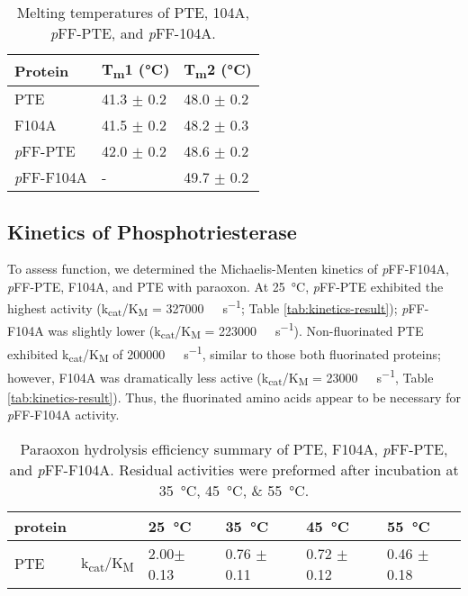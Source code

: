 \begin{refsection}
\begin{table}[htbp]
\centering
\caption[Melting temperatures of PTE, 104A, \emph{p}FF-PTE, and
\emph{p}FF-104A]{Melting temperatures of PTE, 104A, \emph{p}FF-PTE, and
\emph{p}FF-104A.} 
\begin{tabular}{ lll }
  \hline
  Protein & T\textsubscript{m}1 (\si{\celsius}) & T\textsubscript{m}2 (\si{\celsius}) \\
  \hline
  PTE & 41.3 $\pm$ 0.2 & 48.0 $\pm$ 0.2 \\
  F104A & 41.5 $\pm$ 0.2 & 48.2 $\pm$ 0.3 \\
  \emph{p}FF-PTE & 42.0 $\pm$ 0.2 & 48.6 $\pm$ 0.2  \\
  \emph{p}FF-F104A & - & 49.7 $\pm$ 0.2  \\
  \hline
\end{tabular}
    \label{tab:DSC} 
\end{table}

\subsection{Kinetics of Phosphotriesterase}

To assess function, we determined the Michaelis-Menten kinetics of
\emph{p}FF-F104A, \emph{p}FF-PTE, F104A, and PTE with paraoxon. At
\SI{25}{\celsius}, \emph{p}FF-PTE exhibited the highest activity
(k\textsubscript{cat}/K\textsubscript{M} = \SI{327000}{\per\Molar\per\second};
Table \ref{tab:kinetics-result}); \emph{p}FF-F104A was slightly lower
(k\textsubscript{cat}/K\textsubscript{M} = \SI{223000}{\per\Molar\per\second}).
Non-fluorinated PTE exhibited k\textsubscript{cat}/K\textsubscript{M} of
\SI{200000}{\per\Molar\per\second}, similar to those both fluorinated proteins;
however, F104A was dramatically less active
(k\textsubscript{cat}/K\textsubscript{M} = \SI{23000}{\per\Molar\per\second},
Table \ref{tab:kinetics-result}).  Thus, the fluorinated amino acids appear to
be necessary for \emph{p}FF-F104A activity. 
\begin{table}[htbp]
\centering
    \caption[Paraoxon hydrolysis efficiency summary of PTE, F104A,
    \emph{p}FF-PTE, and \emph{p}FF-F104A. Residual activities were preformed
after incubation at \SIlist{35;45;55}{\celsius}.]{Paraoxon hydrolysis
    efficiency summary of PTE, F104A, \emph{p}FF-PTE, and \emph{p}FF-F104A.
    Residual activities were preformed after incubation at
    \SIlist{35;45;55}{\celsius}.} 
    \begin{tabular}{llllll}
    \hline
    protein                 &  & \SI{25}{\celsius} & \SI{35}{\celsius} &
    \SI{45}{\celsius} & \SI{55}{\celsius} \\ 
    \hline
    \multirow{2}{*}{PTE}    & k\textsubscript{cat}/K\textsubscript{M} & 2.00$
    \pm$ 0.13 & 0.76 $\pm$ 0.11 & 0.72 $\pm$ 0.12 & 0.46 $\pm$ 0.18 \\
    

\end{tabular}
\end{table}
\end{refsection}
